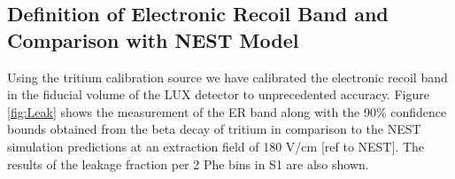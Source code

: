 \subsection{Definition of Electronic Recoil Band and Comparison with NEST Model}

Using the tritium calibration source we have calibrated the electronic recoil band in the fiducial volume of the LUX detector to unprecedented accuracy. Figure \ref{fig:Leak} shows the measurement of the ER band along with the 90\% confidence bounds obtained from the beta decay of tritium in comparison to the NEST simulation predictions at an extraction field of 180 V/cm [ref to NEST]. The results of the leakage fraction per 2 Phe bins in S1 are also shown. 

